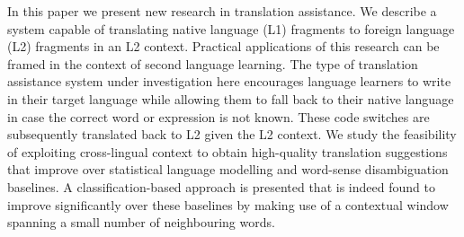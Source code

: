 In this paper we present new research in translation assistance. We describe a system capable of translating native language (L1) fragments to foreign language (L2) fragments in an L2 context. Practical applications of this research can be framed in the context of second language learning.  The type of translation assistance system under investigation here encourages language learners to write in their target language while allowing them to fall back to their native language in case the correct word or expression is not known. These code switches are subsequently translated back to L2 given the L2 context.  We study the feasibility of exploiting cross-lingual context to obtain high-quality translation suggestions that improve over statistical language modelling and word-sense disambiguation baselines. A classification-based approach is presented that is indeed found to improve significantly over these baselines by making use of a contextual window spanning a small number of neighbouring words.
